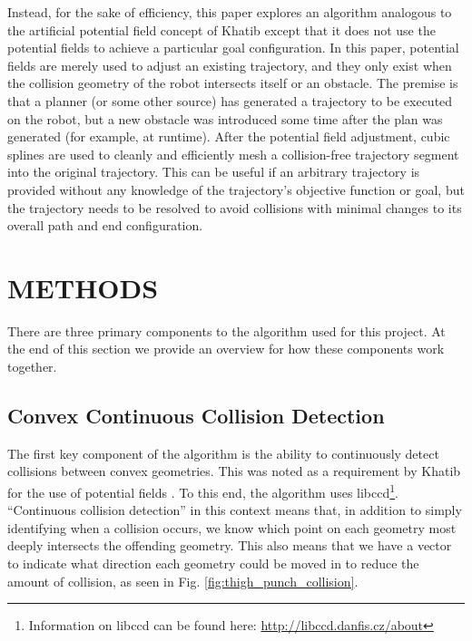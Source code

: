\documentclass[letterpaper, 10 pt, conference]{ieeeconf}  %
\begin{document}
Instead, for the sake of efficiency, this paper explores an algorithm analogous to the artificial potential field concept of Khatib \cite{Khatib} except that it does not use the potential fields to achieve a particular goal configuration. In this paper, potential fields are merely used to adjust an existing trajectory, and they only exist when the collision geometry of the robot intersects itself or an obstacle. The premise is that a planner (or some other source) has generated a trajectory to be executed on the robot, but a new obstacle was introduced some time after the plan was generated (for example, at runtime). After the potential field adjustment, cubic splines are used to cleanly and efficiently mesh a collision-free trajectory segment into the original trajectory. This can be useful if an arbitrary trajectory is provided without any knowledge of the trajectory's objective function or goal, but the trajectory needs to be resolved to avoid collisions with minimal changes to its overall path and end configuration.



\section{METHODS}

There are three primary components to the algorithm used for this project. At the end of this section we provide an overview for how these components work together.

\subsection{Convex Continuous Collision Detection}

The first key component of the algorithm is the ability to continuously detect collisions between convex geometries. This was noted as a requirement by Khatib for the use of potential fields \cite{Khatib}. To this end, the algorithm uses libccd\footnote{Information on libccd can be found here: \url{http://libccd.danfis.cz/about}}. ``Continuous collision detection'' in this context means that, in addition to simply identifying when a collision occurs, we know which point on each geometry most deeply intersects the offending geometry. This also means that we have a vector to indicate what direction each geometry could be moved in to reduce the amount of collision, as seen in Fig. \ref{fig:thigh_punch_collision}. 
\end{document}
